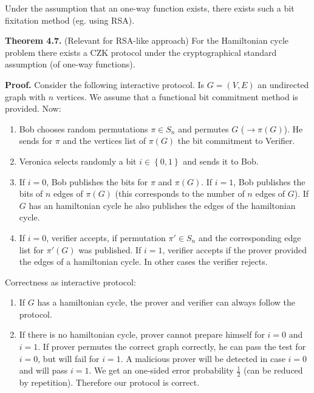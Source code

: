 \documentclass[a4paper]{article}
\newcommand{\set}[1]{\left\{#1\right\}}
\begin{document}
Under the assumption that an one-way function exists, there exists such a
bit fixitation method (eg. using RSA).

\textbf{Theorem 4.7.} (Relevant for RSA-like approach)
  For the Hamiltonian cycle problem there exists a CZK protocol
  under the cryptographical standard assumption (of one-way functions).

\textbf{Proof.}
Consider the following interactive protocol.
Is $G = (V, E)$ an undirected graph with $n$ vertices. We assume that
a functional bit commitment method is provided. Now:
\begin{enumerate}
  \item
    Bob chooses random permutations $\pi \in S_n$ and permutes $G$
    ($\rightarrow \pi(G)$). He sends for $\pi$ and the vertices list
    of $\pi(G)$ the bit commitment to Verifier.
  \item
    Veronica selects randomly a bit $i \in \set{0,1}$ and sends it
    to Bob.
  \item
    If $i = 0$, Bob publishes the bits for $\pi$ and $\pi(G)$.
    If $i = 1$, Bob publishes the bits of $n$ edges of $\pi(G)$
    (this corresponds to the number of $n$ edges of $G$).
    If $G$ has an hamiltonian cycle he also publishes the edges of
    the hamiltonian cycle.
  \item
    If $i = 0$, verifier accepts, if permutation $\pi' \in S_n$ 
    and the corresponding edge list for $\pi'(G)$ was published.
    If $i = 1$, verifier accepts if the prover provided the edges of
    a hamiltonian cycle. In other cases the verifier rejects.
\end{enumerate}

Correctness as interactive protocol:
\begin{enumerate}
  \item If $G$ has a hamiltonian cycle, the prover and verifier
        can always follow the protocol.
  \item
    If there is no hamiltonian cycle, prover cannot prepare
    himself for $i=0$ and $i=1$.
    If prover permutes the correct graph correctly,
    he can pass the test for $i=0$, but will fail for $i=1$.
    A malicious prover will be detected in case $i=0$
    and will pass $i=1$. We get an one-sided error probability
    $\frac12$ (can be reduced by repetition). Therefore our
    protocol is correct.
\end{enumerate}
\end{document}

